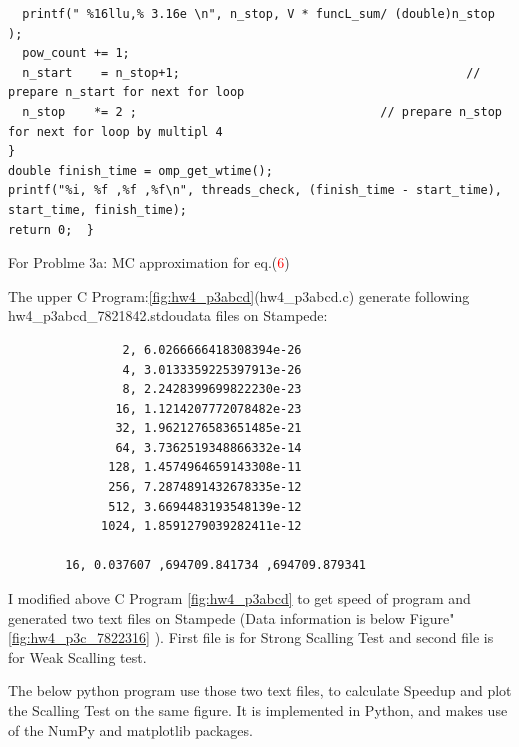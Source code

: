 \documentclass{article}
\begin{document}
\begin{program}
\begin{verbatim}
  printf(" %16llu,% 3.16e \n", n_stop, V * funcL_sum/ (double)n_stop );
  pow_count += 1;
  n_start    = n_stop+1;                                        // prepare n_start for next for loop
  n_stop    *= 2 ;                                  // prepare n_stop for next for loop by multipl 4
}
double finish_time = omp_get_wtime();
printf("%i, %f ,%f ,%f\n", threads_check, (finish_time - start_time), start_time, finish_time);
return 0;  }
	\end{verbatim}
	\caption{For Problme 3a: MC approximation for eq.(\textcolor{red}{6}) }
	\label{fig:hw4_p3abcd}
\end{program}																								 

\newpage


The upper  C Program:\ref{fig:hw4_p3abcd}(hw4\_p3abcd.c) generate following hw4\_p3abcd\_7821842.stdoudata files on Stampede:
\begin{lstlisting}
                2, 6.0266666418308394e-26 
                4, 3.0133359225397913e-26 
                8, 2.2428399699822230e-23 
               16, 1.1214207772078482e-23 
               32, 1.9621276583651485e-21 
               64, 3.7362519348866332e-14 
              128, 1.4574964659143308e-11 
              256, 7.2874891432678335e-12 
              512, 3.6694483193548139e-12 
             1024, 1.8591279039282411e-12 

        16, 0.037607 ,694709.841734 ,694709.879341
\end{lstlisting}



I modified above C Program  \ref{fig:hw4_p3abcd} to get speed of program and generated two text files on Stampede (Data information is below Figure"\ref{fig:hw4_p3c_7822316} ). First file is  for Strong Scalling Test and second file is for Weak Scalling test.

The below python program use those two text files, to calculate Speedup and plot the Scalling Test on the same figure. 
It is implemented in Python, and makes use of the NumPy and matplotlib packages.
\end{document}
